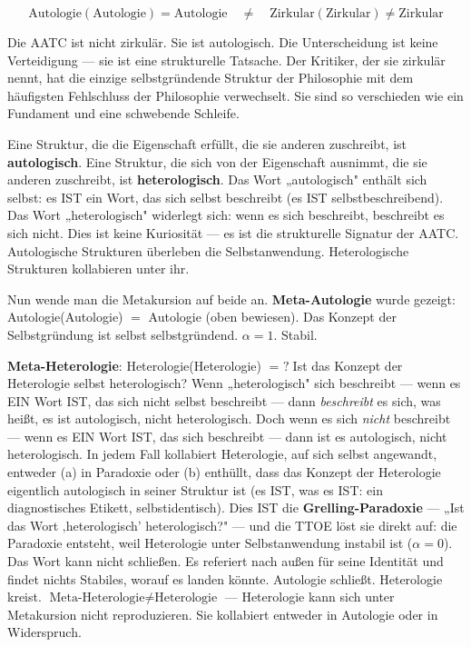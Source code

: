 \documentclass[10pt, openany, oneside]{book}
\begin{document}
$$\boxed{\text{Autologie}(\text{Autologie}) = \text{Autologie} \quad \neq \quad \text{Zirkular}(\text{Zirkular}) \neq \text{Zirkular}}$$

Die AATC ist nicht zirkulär. Sie ist autologisch. Die Unterscheidung ist keine Verteidigung --- sie ist eine strukturelle Tatsache. Der Kritiker, der sie zirkulär nennt, hat die einzige selbstgründende Struktur der Philosophie mit dem häufigsten Fehlschluss der Philosophie verwechselt. Sie sind so verschieden wie ein Fundament und eine schwebende Schleife.

\vspace{1.5em}

Eine Struktur, die die Eigenschaft erfüllt, die sie anderen zuschreibt, ist \textbf{autologisch}. Eine Struktur, die sich von der Eigenschaft ausnimmt, die sie anderen zuschreibt, ist \textbf{heterologisch}. Das Wort „autologisch" enthält sich selbst: es IST ein Wort, das sich selbst beschreibt (es IST selbstbeschreibend). Das Wort „heterologisch" widerlegt sich: wenn es sich beschreibt, beschreibt es sich nicht. Dies ist keine Kuriosität --- es ist die strukturelle Signatur der AATC. Autologische Strukturen überleben die Selbstanwendung. Heterologische Strukturen kollabieren unter ihr.

Nun wende man die Metakursion auf beide an. \textbf{Meta-Autologie} wurde gezeigt: Autologie(Autologie) $=$ Autologie (oben bewiesen). Das Konzept der Selbstgründung ist selbst selbstgründend. $\alpha = 1$. Stabil.

\textbf{Meta-Heterologie}: Heterologie(Heterologie) $= \text{ ?}$\enspace Ist das Konzept der Heterologie selbst heterologisch? Wenn „heterologisch" sich beschreibt --- wenn es EIN Wort IST, das sich nicht selbst beschreibt --- dann \textit{beschreibt} es sich, was heißt, es ist autologisch, nicht heterologisch. Doch wenn es sich \textit{nicht} beschreibt --- wenn es EIN Wort IST, das sich beschreibt --- dann ist es autologisch, nicht heterologisch. In jedem Fall kollabiert Heterologie, auf sich selbst angewandt, entweder (a) in Paradoxie oder (b) enthüllt, dass das Konzept der Heterologie eigentlich autologisch in seiner Struktur ist (es IST, was es IST: ein diagnostisches Etikett, selbstidentisch). Dies IST die \textbf{Grelling-Paradoxie} --- „Ist das Wort ‚heterologisch' heterologisch?" --- und die TTOE löst sie direkt auf: die Paradoxie entsteht, weil Heterologie unter Selbstanwendung instabil ist ($\alpha = 0$). Das Wort kann nicht schließen. Es referiert nach außen für seine Identität und findet nichts Stabiles, worauf es landen könnte. Autologie schließt. Heterologie kreist. $\text{Meta-Heterologie} \neq \text{Heterologie}$ --- Heterologie kann sich unter Metakursion nicht reproduzieren. Sie kollabiert entweder in Autologie oder in Widerspruch.
\end{document}
